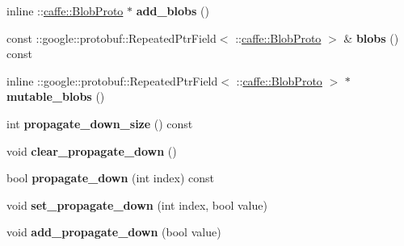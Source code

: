 \begin{DoxyCompactItemize}
\item 
\mbox{\label{classcaffe_1_1_layer_parameter_adf25fc2214cf7ada456b14b1a68d60d2}} 
inline \+::\mbox{\hyperlink{classcaffe_1_1_blob_proto}{caffe\+::\+Blob\+Proto}} $\ast$ {\bfseries add\+\_\+blobs} ()
\item 
\mbox{\label{classcaffe_1_1_layer_parameter_a1413a8b5f6704af74ef8b5f4d5c07b52}} 
const \+::google\+::protobuf\+::\+Repeated\+Ptr\+Field$<$ \+::\mbox{\hyperlink{classcaffe_1_1_blob_proto}{caffe\+::\+Blob\+Proto}} $>$ \& {\bfseries blobs} () const
\item 
\mbox{\label{classcaffe_1_1_layer_parameter_ac6e30cf7b64a7f07465bbe3d3ce8fd5e}} 
inline \+::google\+::protobuf\+::\+Repeated\+Ptr\+Field$<$ \+::\mbox{\hyperlink{classcaffe_1_1_blob_proto}{caffe\+::\+Blob\+Proto}} $>$ $\ast$ {\bfseries mutable\+\_\+blobs} ()
\item 
\mbox{\label{classcaffe_1_1_layer_parameter_a0bb492dd2c13f8d6c8698f4b3837c04f}} 
int {\bfseries propagate\+\_\+down\+\_\+size} () const
\item 
\mbox{\label{classcaffe_1_1_layer_parameter_a908b57eb3a591486ab4819822ecfd57d}} 
void {\bfseries clear\+\_\+propagate\+\_\+down} ()
\item 
\mbox{\label{classcaffe_1_1_layer_parameter_a9d06015b62b04e5656909a221f05326f}} 
bool {\bfseries propagate\+\_\+down} (int index) const
\item 
\mbox{\label{classcaffe_1_1_layer_parameter_a9d89653a41b5e0824cf4a9a007bc366b}} 
void {\bfseries set\+\_\+propagate\+\_\+down} (int index, bool value)
\item 
\mbox{\label{classcaffe_1_1_layer_parameter_a701b37460c3e75243d212bea0cc52cd3}} 
void {\bfseries add\+\_\+propagate\+\_\+down} (bool value)
\item 
\mbox{\label{classcaffe_1_1_layer_parameter_a9014ee44cf44d913946aa81132110057}} 

\end{DoxyCompactItemize}
